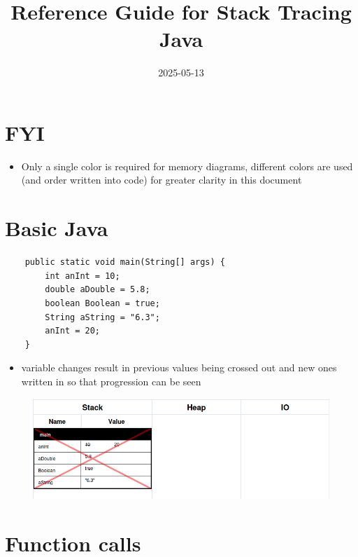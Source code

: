 \documentclass{article}
\begin{document}
\title{Reference Guide for Stack Tracing Java}
\author{}
\date{2025-05-13}

\maketitle

\section*{FYI}
\begin{itemize}
	\item Only a single color is required for memory diagrams, different colors
	are used (and order written into code) for greater clarity in this document
\end{itemize}

\section{Basic Java}

\begin{verbatim}
	public static void main(String[] args) {
	    int anInt = 10;
	    double aDouble = 5.8;
	    boolean Boolean = true;
	    String aString = "6.3";
	    anInt = 20;
	}
\end{verbatim}

\begin{itemize}
	\item variable changes result in previous values being crossed out and
	new ones written in so that progression can be seen
\end{itemize}

\begin{figure}[H]
	\centering
	\includegraphics{basicVariables.png}
\end{figure}

\pagebreak


\section{Function calls}
\end{document}
